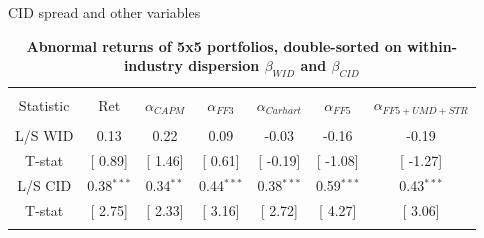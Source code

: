 \documentclass{beamer}
\begin{document}
\begin{frame}{CID spread and other variables}

\begin{table}[!htbp] \centering 
  \caption{\textbf{Abnormal returns of 5x5 portfolios, double-sorted on within-industry dispersion $\beta_{WID}$ and $\beta_{CID}$}} 
  \label{} 
  \footnotesize
\begin{tabular}{@{\extracolsep{2pt}} ccccccc} 
\\[-1.8ex]\hline 
\hline \\[-1.8ex] 
Statistic & Ret & $\alpha_{CAPM}$ & $\alpha_{FF3}$ & $\alpha_{Carhart}$ & $\alpha_{FF5}$ & $\alpha_{FF5+UMD+STR}$ \\ 
\hline \\[-1.8ex] 
L/S WID & 0.13 & 0.22 & 0.09 & -0.03 & -0.16 & -0.19 \\ 
T-stat & [ 0.89] & [ 1.46] & [ 0.61] & [ -0.19] & [ -1.08] & [ -1.27] \\ 
L/S CID & 0.38$^{***}$ & 0.34$^{**}$ & 0.44$^{***}$ & 0.38$^{***}$ & 0.59$^{***}$ & 0.43$^{***}$ \\ 
T-stat & [ 2.75] & [ 2.33] & [ 3.16] & [ 2.72] & [ 4.27] & [ 3.06] \\ 
\hline \\[-1.8ex] 
\end{tabular} 
\end{table}

\end{frame}
\end{document}
